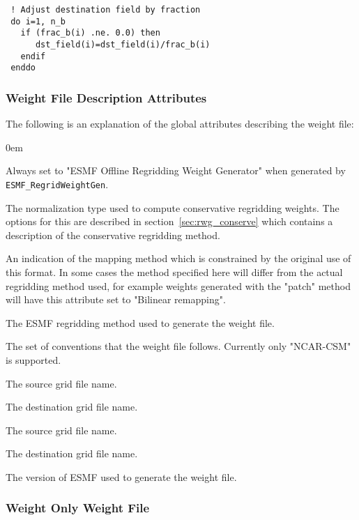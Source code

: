 \begin{verbatim}
 ! Adjust destination field by fraction
 do i=1, n_b
   if (frac_b(i) .ne. 0.0) then
      dst_field(i)=dst_field(i)/frac_b(i)
   endif
 enddo
\end{verbatim}


\subsubsection{Weight File Description Attributes}

The following is an explanation of the global attributes describing the weight file:
\begin{description}
  \itemsep0em
  \item[title] Always set to  "ESMF Offline Regridding Weight Generator" when generated by {\tt ESMF\_RegridWeightGen}.
  \item[normalization] The normalization type used to compute conservative regridding weights. The options for this are described in section~\ref{sec:rwg_conserve} which contains a description of the conservative regridding method.  
  \item[map\_method] An indication of the mapping method which is constrained by the original use of this format. In some cases the method specified here will differ from the actual regridding method used, for example weights generated with the "patch" method will have this attribute set to "Bilinear remapping". 
  \item[ESMF\_regrid\_method] The ESMF regridding method used to generate the weight file. 
  \item[conventions] The set of conventions that the weight file follows. Currently only "NCAR-CSM" is supported.
  \item[domain\_a] The source grid file name. 
  \item[domain\_b] The destination grid file name. 
  \item[grid\_file\_src] The source grid file name. 
  \item[grid\_file\_dst] The destination grid file name. 
  \item[ESMF\_version] The version of ESMF used to generate the weight file.
\end{description}

\subsubsection{Weight Only Weight File}


